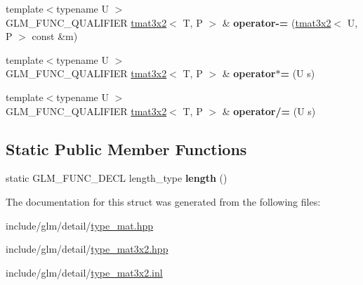 \begin{DoxyCompactItemize}
{\footnotesize template$<$typename U $>$ }\\G\+L\+M\+\_\+\+F\+U\+N\+C\+\_\+\+Q\+U\+A\+L\+I\+F\+I\+ER \hyperlink{structglm_1_1tmat3x2}{tmat3x2}$<$ T, P $>$ \& {\bfseries operator-\/=} (\hyperlink{structglm_1_1tmat3x2}{tmat3x2}$<$ U, P $>$ const \&m)
\item 
\mbox{\label{structglm_1_1tmat3x2_ae9ca1018839d8c718c7bdd0fa2d808ff}} 
{\footnotesize template$<$typename U $>$ }\\G\+L\+M\+\_\+\+F\+U\+N\+C\+\_\+\+Q\+U\+A\+L\+I\+F\+I\+ER \hyperlink{structglm_1_1tmat3x2}{tmat3x2}$<$ T, P $>$ \& {\bfseries operator$\ast$=} (U s)
\item 
\mbox{\label{structglm_1_1tmat3x2_a9c34c87d7b9be6e3301bc8e9186c96bf}} 
{\footnotesize template$<$typename U $>$ }\\G\+L\+M\+\_\+\+F\+U\+N\+C\+\_\+\+Q\+U\+A\+L\+I\+F\+I\+ER \hyperlink{structglm_1_1tmat3x2}{tmat3x2}$<$ T, P $>$ \& {\bfseries operator/=} (U s)
\end{DoxyCompactItemize}
\subsection*{Static Public Member Functions}
\begin{DoxyCompactItemize}
\item 
\mbox{\label{structglm_1_1tmat3x2_ae771b31ecb7a8567bb6eb08b17df1b83}} 
static G\+L\+M\+\_\+\+F\+U\+N\+C\+\_\+\+D\+E\+CL length\+\_\+type {\bfseries length} ()
\end{DoxyCompactItemize}


The documentation for this struct was generated from the following files\+:\begin{DoxyCompactItemize}
\item 
include/glm/detail/\hyperlink{type__mat_8hpp}{type\+\_\+mat.\+hpp}\item 
include/glm/detail/\hyperlink{type__mat3x2_8hpp}{type\+\_\+mat3x2.\+hpp}\item 
include/glm/detail/\hyperlink{type__mat3x2_8inl}{type\+\_\+mat3x2.\+inl}\end{DoxyCompactItemize}
